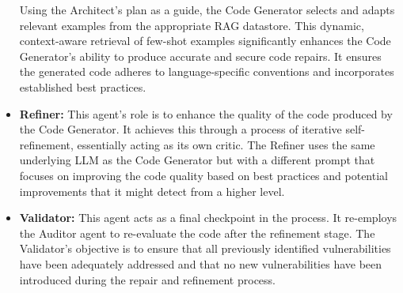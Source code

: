 \begin{itemize}
    Using the Architect's plan as a guide, the Code Generator selects and adapts relevant examples from the appropriate RAG datastore. This dynamic, context-aware retrieval of few-shot examples significantly enhances the Code Generator's ability to produce accurate and secure code repairs. It ensures the generated code adheres to language-specific conventions and incorporates established best practices.
    \item \textbf{Refiner:} This agent's role is to enhance the quality of the code produced by the Code Generator. It achieves this through a process of iterative self-refinement, essentially acting as its own critic. The Refiner uses the same underlying LLM as the Code Generator but with a different prompt that focuses on improving the code quality based on best practices and potential improvements that it might detect from a higher level.
    \item \textbf{Validator:} This agent acts as a final checkpoint in the process. It re-employs the Auditor agent to re-evaluate the code after the refinement stage. The Validator's objective is to ensure that all previously identified vulnerabilities have been adequately addressed and that no new vulnerabilities have been introduced during the repair and refinement process.
\end{itemize}



